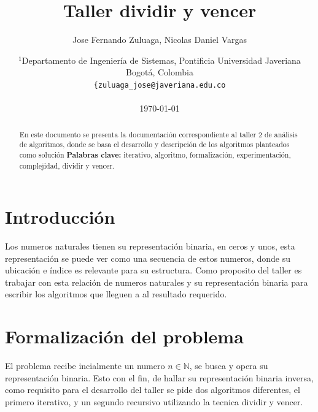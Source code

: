 \documentclass[letter]{article}
\title{Taller dividir y vencer}
\author{Jose Fernando Zuluaga, Nicolas Daniel Vargas}
\date{
	$^1$Departamento de Ingeniería de Sistemas, Pontificia Universidad Javeriana\\Bogotá,  Colombia \\
	\texttt{\{zuluaga\_jose@javeriana.edu.co}\\~\\
	\today
}
\begin{document}
\maketitle
	
\begin{abstract}
En este documento se presenta la documentación correspondiente al taller 2 de análisis de algoritmos, donde se basa el desarrollo y descripción de los algoritmos planteados como solución
\textbf{Palabras clave:} iterativo, algoritmo, formalización, experimentación, complejidad, dividir y vencer.
\end{abstract}

\tableofcontents
	
\section{Introducción} \label{intro}
Los numeros naturales tienen su representación binaria, en ceros y unos, esta representación se puede ver como una secuencia de estos numeros, donde su ubicación e índice es relevante para su estructura. Como proposito del taller es trabajar con esta relación de numeros naturales y su representación binaria para escribir los algoritmos que lleguen a al resultado requerido.

\section{Formalización del problema} \label{formalizacion}
El problema recibe incialmente un numero $n\in \mathbb{N}$, se busca y opera su representación binaria. Esto con el fin, de hallar su representación binaria inversa, como requisito para el desarrollo del taller se pide dos algoritmos diferentes, el primero iterativo, y un segundo recursivo utilizando la tecnica dividir y vencer.
\end{document}

